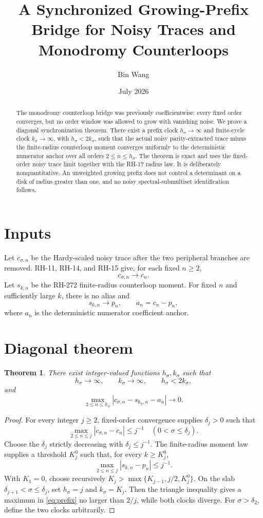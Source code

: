 \documentclass[11pt]{article}
\title{A Synchronized Growing-Prefix Bridge for Noisy Traces and Monodromy Counterloops}
\author{Bin Wang}\date{July 2026}
\newtheorem{theorem}{Theorem}[section]
\theoremstyle{remark}\newtheorem{remark}[theorem]{Remark}
\begin{document}
\maketitle
\begin{abstract}
The monodromy counterloop bridge was previously coefficientwise: every fixed
order converges, but no order window was allowed to grow with vanishing
noise.  We prove a diagonal synchronization theorem.  There exist a prefix
clock $h_\sigma\to\infty$ and finite-cycle clock $k_\sigma\to\infty$, with
$h_\sigma<2k_\sigma$, such that the actual noisy parity-extracted trace minus
the finite-radius counterloop moment converges uniformly to the deterministic
numerator anchor over all orders $2\le n\le h_\sigma$.  The theorem is exact
and uses the fixed-order noisy trace limit together with the RH-17 radius law.
It is deliberately nonquantitative.  An unweighted growing prefix does not
control a determinant on a disk of radius greater than one, and no noisy
spectral-submultiset identification follows.
\end{abstract}

\section{Inputs}
Let $c_{\sigma,n}$ be the Hardy-scaled noisy trace after the two peripheral
branches are removed.  RH-11, RH-14, and RH-15 give, for each fixed $n\ge2$,
\[
 c_{\sigma,n}\longrightarrow c_n.
\]
Let $s_{k,n}$ be the RH-272 finite-radius counterloop moment.  For fixed $n$
and sufficiently large $k$, there is no alias and
\[
 s_{k,n}\longrightarrow p_n,
 \qquad
 a_n=c_n-p_n,
\]
where $a_n$ is the deterministic numerator coefficient anchor.

\section{Diagonal theorem}
\begin{theorem}\label{thm:diagonal}
There exist integer-valued functions $h_\sigma,k_\sigma$ such that
\[
 h_\sigma\to\infty,\qquad k_\sigma\to\infty,
 \qquad h_\sigma<2k_\sigma,
\]
and
\begin{equation}\label{eq:prefix}
 \max_{2\le n\le h_\sigma}
 |c_{\sigma,n}-s_{k_\sigma,n}-a_n|\longrightarrow0.
\end{equation}
\end{theorem}
\begin{proof}
For every integer $j\ge2$, fixed-order convergence supplies
$\delta_j>0$ such that
\[
 \max_{2\le n\le j}|c_{\sigma,n}-c_n|\le j^{-1}
 \quad(0<\sigma\le\delta_j).
\]
Choose the $\delta_j$ strictly decreasing with $\delta_j\le j^{-1}$.  The
finite-radius moment law supplies a threshold $K_j^0$ such that, for every
$k\ge K_j^0$,
\[
 \max_{2\le n\le j}|s_{k,n}-p_n|\le j^{-1}.
\]
With $K_1=0$, choose recursively
$K_j>\max\{K_{j-1},j/2,K_j^0\}$.  On the slab
$\delta_{j+1}<\sigma\le\delta_j$, set
$h_\sigma=j$ and $k_\sigma=K_j$.  Then the triangle inequality gives a
maximum in \eqref{eq:prefix} no larger than $2/j$, while both clocks diverge.
For $\sigma>\delta_2$, define the two clocks arbitrarily.
\end{proof}
\end{document}
